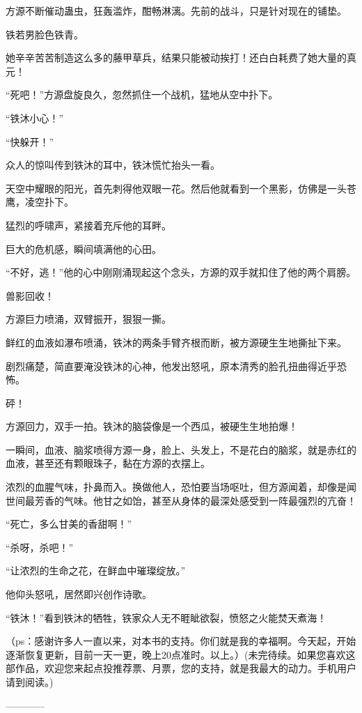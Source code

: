 \begin{this_body}
方源不断催动蛊虫，狂轰滥炸，酣畅淋漓。先前的战斗，只是针对现在的铺垫。

铁若男脸色铁青。

她辛辛苦苦制造这么多的藤甲草兵，结果只能被动挨打！还白白耗费了她大量的真元！

“死吧！”方源盘旋良久，忽然抓住一个战机，猛地从空中扑下。

“铁沐小心！”

“快躲开！”

众人的惊叫传到铁沐的耳中，铁沐慌忙抬头一看。

天空中耀眼的阳光，首先刺得他双眼一花。然后他就看到一个黑影，仿佛是一头苍鹰，凌空扑下。

猛烈的呼啸声，紧接着充斥他的耳畔。

巨大的危机感，瞬间填满他的心田。

“不好，逃！”他的心中刚刚涌现起这个念头，方源的双手就扣住了他的两个肩膀。

兽影回收！

方源巨力喷涌，双臂振开，狠狠一撕。

鲜红的血液如瀑布喷涌，铁沐的两条手臂齐根而断，被方源硬生生地撕扯下来。

剧烈痛楚，简直要淹没铁沐的心神，他发出怒吼，原本清秀的脸孔扭曲得近乎恐怖。

砰！

方源回力，双手一拍。铁沐的脑袋像是一个西瓜，被硬生生地拍爆！

一瞬间，血液、脑浆喷得方源一身，脸上、头发上，不是花白的脑浆，就是赤红的血液，甚至还有颗眼珠子，黏在方源的衣摆上。

浓烈的血腥气味，扑鼻而入。换做他人，恐怕要当场呕吐，但方源闻着，却像是闻世间最芳香的气味。他甘之如饴，甚至从身体的最深处感受到一阵最强烈的亢奋！

“死亡，多么甘美的香甜啊！”

“杀呀，杀吧！”

“让浓烈的生命之花，在鲜血中璀璨绽放。”

他仰头怒吼，居然即兴创作诗歌。

“铁沐！”看到铁沐的牺牲，铁家众人无不睚眦欲裂，愤怒之火能焚天煮海！

（ps：感谢许多人一直以来，对本书的支持。你们就是我的幸福啊。今天起，开始逐渐恢复更新，目前一天一更，晚上20点准时。以上。）(未完待续。如果您喜欢这部作品，欢迎您来起点投推荐票、月票，您的支持，就是我最大的动力。手机用户请到阅读。)

------------

\end{this_body}

